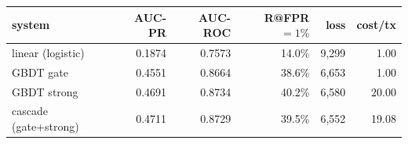\begin{tabular}{lrrrrr}
\toprule
system & AUC-PR & AUC-ROC & R@FPR$=1\%$ & loss & cost/tx \\
\midrule
linear (logistic) & 0.1874 & 0.7573 & 14.0\% & 9{,}299 & 1.00 \\
GBDT gate & 0.4551 & 0.8664 & 38.6\% & 6{,}653 & 1.00 \\
GBDT strong & 0.4691 & 0.8734 & 40.2\% & 6{,}580 & 20.00 \\
cascade (gate+strong) & 0.4711 & 0.8729 & 39.5\% & 6{,}552 & 19.08 \\
\bottomrule
\end{tabular}
